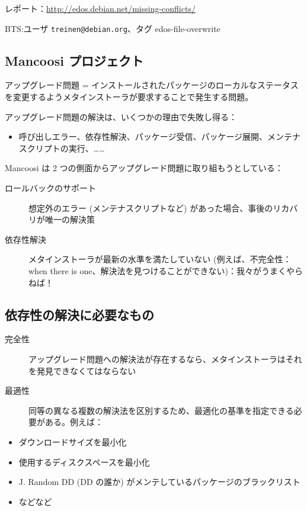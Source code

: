 \documentclass[mingoth,a4paper]{jsarticle}
\begin{document}
\begin{commandline}
レポート：\url{http://edos.debian.net/missing-conflicts/}

BTS:ユーザ \verb|treinen@debian.org|、タグ edos-file-overwrite


\subsection{Mancoosi プロジェクト}

アップグレード問題 = インストールされたパッケージのローカルなステータスを変更するようメタインストーラが要求することで発生する問題。

アップグレード問題の解決は、いくつかの理由で失敗し得る：

\begin{itemize}
\item 呼び出しエラー、依存性解決、パッケージ受信、パッケージ展開、メンテナスクリプトの実行、……
\end{itemize}

Mancoosi は 2 つの側面からアップグレード問題に取り組もうとしている：

\begin{description}
\item[ロールバックのサポート] \mbox{}

想定外のエラー (メンテナスクリプトなど) があった場合、事後のリカバリが唯一の解決策
\item[依存性解決] \mbox{}

メタインストーラが最新の水準を満たしていない (例えば、不完全性：when there is one、解決法を見つけることができない)：我々がうまくやらねば！
\end{description}


\subsection{依存性の解決に必要なもの}

\begin{description}
\item[完全性] \mbox{}

アップグレード問題への解決法が存在するなら、メタインストーラはそれを発見できなくてはならない
\item[最適性] \mbox{}

同等の異なる複数の解決法を区別するため、最適化の基準を指定できる必要がある。例えば：
\end{description}

\begin{itemize}
\item ダウンロードサイズを最小化
\item 使用するディスクスペースを最小化
\item J. Random DD (DD の誰か) がメンテしているパッケージのブラックリスト
\item などなど
\end{itemize}


\end{commandline}
\end{document}
